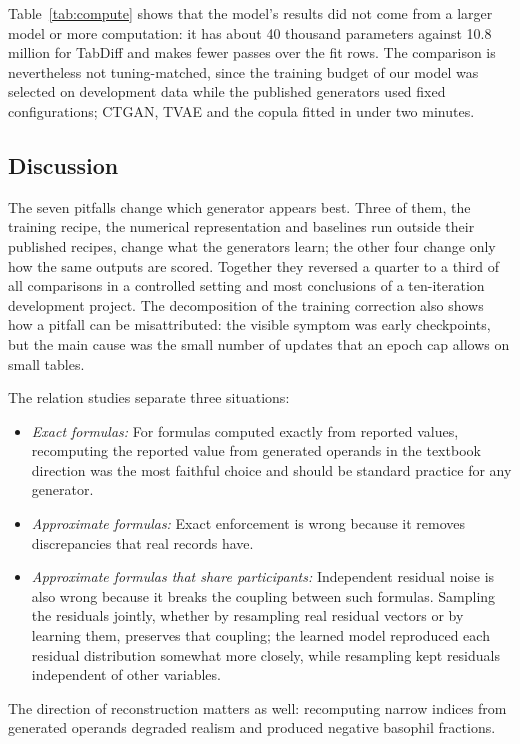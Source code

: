 \documentclass[conference]{IEEEtran}
\begin{document}
Table~\ref{tab:compute} shows that the model's results did not come from a larger model or more computation: it has about 40 thousand parameters against 10.8 million for TabDiff and makes fewer passes over the fit rows. The comparison is nevertheless not tuning-matched, since the training budget of our model was selected on development data while the published generators used fixed configurations; CTGAN, TVAE and the copula fitted in under two minutes.

\subsection{Discussion}

The seven pitfalls change which generator appears best. Three of them, the training recipe, the numerical representation and baselines run outside their published recipes, change what the generators learn; the other four change only how the same outputs are scored. Together they reversed a quarter to a third of all comparisons in a controlled setting and most conclusions of a ten-iteration development project. The decomposition of the training correction also shows how a pitfall can be misattributed: the visible symptom was early checkpoints, but the main cause was the small number of updates that an epoch cap allows on small tables.

The relation studies separate three situations:
\begin{itemize}
\item \textit{Exact formulas:} For formulas computed exactly from reported values, recomputing the reported value from generated operands in the textbook direction was the most faithful choice and should be standard practice for any generator.
\item \textit{Approximate formulas:} Exact enforcement is wrong because it removes discrepancies that real records have.
\item \textit{Approximate formulas that share participants:} Independent residual noise is also wrong because it breaks the coupling between such formulas. Sampling the residuals jointly, whether by resampling real residual vectors or by learning them, preserves that coupling; the learned model reproduced each residual distribution somewhat more closely, while resampling kept residuals independent of other variables.
\end{itemize}
The direction of reconstruction matters as well: recomputing narrow indices from generated operands degraded realism and produced negative basophil fractions.
\end{document}

